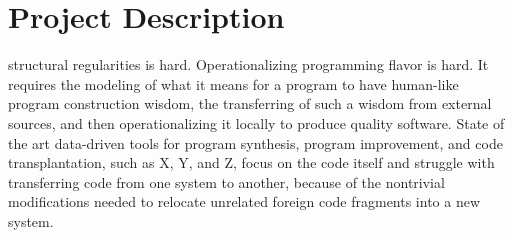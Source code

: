 \chapter{Project Description}{}
\label{sec:related}

 structural regularities is hard. Operationalizing programming flavor is hard. It requires the modeling of what it means for a program to have human-like program construction wisdom, the transferring of such a wisdom from external sources, and then operationalizing it locally to produce quality software. State of the art data-driven tools for program synthesis, program improvement, and code transplantation, such as X, Y, and Z, focus on the code itself and struggle with transferring code from one system to another, because of the nontrivial modifications needed to relocate unrelated foreign code fragments into a new system. 